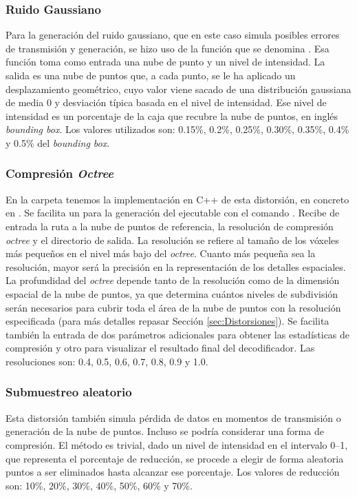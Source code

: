 \subsubsection*{Ruido Gaussiano} 
Para la generación del ruido gaussiano, que en este caso simula posibles 
errores de transmisión y generación, se hizo uso de la función que se denomina
. 
Esa función toma como entrada 
una nube de punto y un nivel de intensidad. La salida es una nube de puntos que, 
a cada punto, se le ha aplicado un desplazamiento geométrico, cuyo valor 
viene sacado de una distribución gaussiana de media 0 y desviación típica 
basada en el nivel de intensidad. Ese nivel de intensidad es un porcentaje 
de la caja que recubre la nube de puntos, en inglés \emph{bounding box}.
Los valores utilizados son: 0.15\%, 0.2\%, 0.25\%, 0.30\%, 0.35\%, 0.4\% y 0.5\%
del \emph{bounding box}.
\subsubsection*{Compresión \emph{Octree}}
En la carpeta  tenemos la implementación en C++ de esta 
distorsión, en concreto en . Se facilita 
un  para la generación del ejecutable con el comando 
. Recibe de entrada la ruta a la nube de puntos de referencia, 
la resolución de compresión \emph{octree} y el directorio de salida. 
La resolución se refiere al tamaño de los vóxeles más pequeños en el nivel más 
bajo del \emph{octree}. Cuanto más pequeña sea la resolución, mayor será la precisión 
en la representación de los detalles espaciales. 
La profundidad del \emph{octree} depende tanto de la resolución como de la dimensión 
espacial de la nube de puntos, ya que determina cuántos niveles de subdivisión 
serán necesarios para cubrir toda el área de la nube de puntos con la resolución 
especificada (para más detalles repasar Sección \ref{sec:Distorsiones}). 
Se facilita también la entrada de dos parámetros adicionales para obtener 
las estadísticas de compresión y otro para visualizar el resultado final del 
decodificador. Las resoluciones son: 0.4, 0.5, 0.6, 0.7, 0.8, 0.9 y 1.0.
\subsubsection*{Submuestreo aleatorio}
Esta distorsión también simula pérdida de datos en momentos de transmisión o 
generación de la nube de puntos. Incluso se podría considerar una forma de 
compresión. El método es trivial, dado un nivel de intensidad en el intervalo 
0--1, que representa el porcentaje de reducción, se procede a elegir de forma 
aleatoria puntos a ser eliminados hasta alcanzar ese porcentaje. Los valores 
de reducción son: 10\%, 20\%, 30\%, 40\%, 50\%, 60\% y 70\%.
